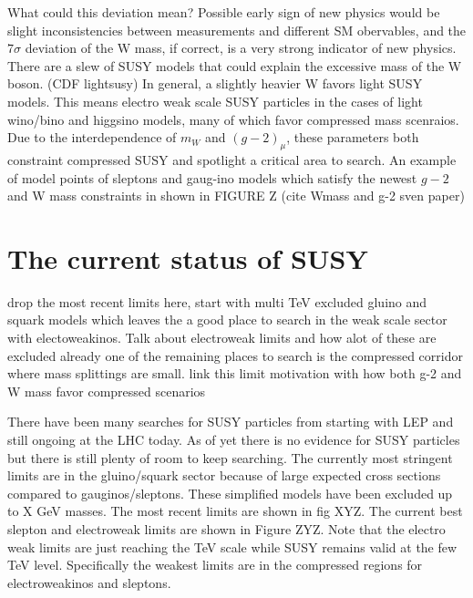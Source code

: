 What could this deviation mean?
Possible early sign of new physics would be slight inconsistencies between measurements and different SM obervables, and the $7\sigma$ deviation of the W mass, if correct, is a very strong indicator of new physics. There are a slew of SUSY models that could explain the excessive mass of the W boson. (CDF lightsusy) In general, a slightly heavier W favors light SUSY models. This means electro weak scale SUSY particles in the cases of light wino/bino and higgsino models, many of which favor compressed mass scenraios. Due to the interdependence of $m_W$ and $(g-2)_\mu$, these parameters both constraint compressed SUSY and spotlight a critical area to search. An example of model points of sleptons and gaug-ino models which satisfy the newest $g-2$ and W mass constraints in shown in FIGURE Z (cite Wmass and g-2 sven paper)


\section{The current status of SUSY}
drop the most recent limits here, start with multi TeV excluded gluino and squark models which leaves the a good place to search in the weak scale sector with electoweakinos. Talk about electroweak limits and how alot of these are excluded already one of the remaining places to search is the compressed corridor where mass splittings are small. link this limit motivation with how both g-2 and W mass favor compressed scenarios

There have been many searches for SUSY particles from starting with LEP and still ongoing at the LHC today. As of yet there is no evidence for SUSY particles but there is still plenty of room to keep searching. The currently most stringent limits are in the gluino/squark sector because of large expected cross sections compared to gauginos/sleptons. These simplified models have been excluded up to X GeV masses. The most recent limits are shown in fig XYZ.  The current best slepton and electroweak limits are shown in Figure ZYZ. Note that the electro weak limits are just reaching the TeV scale while SUSY remains valid at the few TeV level. Specifically the weakest limits are in the compressed regions for electroweakinos and sleptons. 



